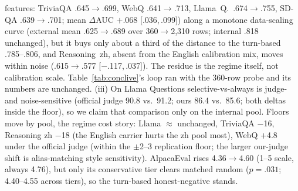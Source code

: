 features: TriviaQA .645$\to$.699, WebQ .641$\to$.713, Llama~Q.\
.674$\to$.755, SD-QA .639$\to$.701; mean $\Delta$AUC $+$.068
[.036,\,.099]) along a monotone data-scaling curve (external mean
.625$\to$.689 over 360$\to$2{,}310 rows; internal .818 unchanged), but it buys only about a third of the distance to the turn-based
.785--.806, and Reasoning~zh, absent from the English calibration
mix, moves within noise (.615$\to$.577 [$-$.117,\,.037]). The
residue is the regime itself, not calibration scale.
Table~\ref{tab:conclive}'s loop ran with the 360-row probe and its
numbers are unchanged. (iii) On Llama
Questions selective-vs-always is judge- and noise-sensitive (official
judge 90.8 vs.\ 91.2; ours 86.4 vs.\ 85.6; both deltas inside the
floor), so we claim that comparison only on the internal pool.
Floors move by pool, the regime cost
story: Llama $\approx$ unchanged, TriviaQA $-$16, Reasoning zh $-$18
(the English carrier hurts the zh pool most), WebQ $+$4.8 under the
official judge (within the $\pm$2--3 replication floor; the larger
our-judge shift is alias-matching style sensitivity). AlpacaEval
rises 4.36$\to$4.60 (1--5 scale, always 4.76), but only its
conservative tier clears matched random ($p{=}.031$; 4.40--4.55
across tiers), so the turn-based honest-negative stands.

